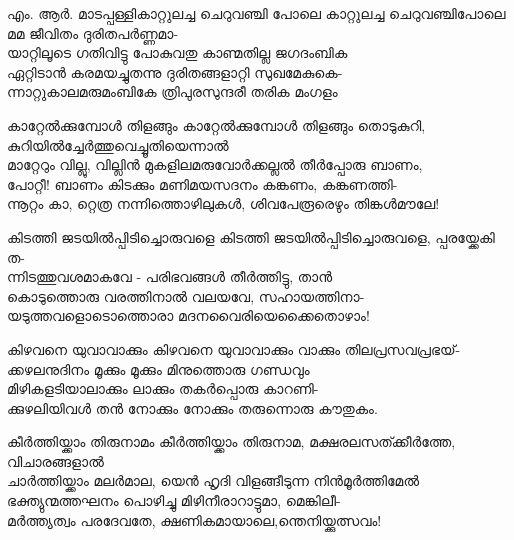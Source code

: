 \begin{enumerate}


\begin{slokam}{\VKm}{എം. ആർ. മാടപ്പള്ളി}{കാറ്റുലച്ച ചെറുവഞ്ചി പോലെ}
കാറ്റുലച്ച ചെറുവഞ്ചിപോലെ മമ ജീവിതം ദുരിതപർണ്ണമാ-\\
യാറ്റിലൂടെ ഗതിവിട്ടു പോകുവതു കാണ്മതില്ല ജഗദംബിക\\ 
ഏറ്റിടാൻ കരമയച്ചുതന്നു ദുരിതങ്ങളാറ്റി സുഖമേകുകെ-\\
ന്നാറ്റുകാലമരുമംബികേ ത്രിപുരസുന്ദരീ തരിക മംഗളം
\end{slokam}


\begin{slokam}{\VSr}{\Unk}{കാറ്റേൽക്കുമ്പോള്‍ തിളങ്ങും}
കാറ്റേൽക്കുമ്പോള്‍ തിളങ്ങും തൊടുകുറി, കുറിയിൽച്ചേർത്തുവെച്ചൂതിയെന്നാൽ\\
മാറ്റേറും വില്ലു, വില്ലിൻ മുകളിലമരുവോർക്കല്ലൽ തീർപ്പോരു ബാണം,\\
പോറ്റീ! ബാണം കിടക്കും മണിമയസദനം കങ്കണം, കങ്കണത്തി-\\
ന്നൂറ്റം കാ, റ്റെത്ര നന്നിത്തൊഴിലുകള്‍, ശിവപേരൂരെഴും തിങ്കള്‍മൗലേ!
\end{slokam}


\begin{slokam}{\VPv}{\UN}{കിടത്തി ജടയിൽപ്പിടിച്ചൊരുവളെ}
കിടത്തി ജടയിൽപ്പിടിച്ചൊരുവളെ, പ്പരയ്ക്കേകി ത-\\
ന്നിടത്തുവശമാകവേ - പരിഭവങ്ങള്‍ തീർത്തിട്ടു, താൻ\\
കൊടുത്തൊരു വരത്തിനാൽ വലയവേ, സഹായത്തിനാ-\\
യടുത്തവളൊടൊത്തൊരാ മദനവൈരിയെക്കൈതൊഴാം!
\end{slokam}




\begin{slokam}{\VHr}{\KKK}{കിഴവനെ യുവാവാക്കും}
കിഴവനെ യുവാവാക്കും വാക്കും തിലപ്രസവപ്രഭയ്‌-\\
ക്കഴലനുദിനം മൂക്കും മൂക്കും മിനുത്തൊരു ഗണ്ഡവും\\
മിഴികളടിയാലാക്കും ലാക്കും തകർപ്പൊരു കാറണി-\\
ക്കുഴലിയിവള്‍ തൻ നോക്കും നോക്കും തരുന്നൊരു കൗതുകം.
\end{slokam}



\begin{slokam}{\VSv}{\PCM}{കീര്‍ത്തിയ്ക്കാം തിരുനാമം}
കീര്‍ത്തിയ്ക്കാം തിരുനാമ, മക്ഷരലസത്ക്കീര്‍ത്തേ, വിചാരങ്ങളാല്‍\\
ചാര്‍ത്തിയ്ക്കാം മലര്‍മാല, യെന്‍ ഹൃദി വിളങ്ങീടുന്ന നിന്‍മൂര്‍ത്തിമേല്‍\\
ഭക്ത്യുന്മത്തഘനം പൊഴിച്ചു മിഴിനീരാറാട്ടുമാ, മെങ്കിലീ-\\
മര്‍ത്ത്യത്വം പരദേവതേ, ക്ഷണികമായാലെ,ന്തെനിയ്ക്കുത്സവം!
\end{slokam}


\end{enumerate}

